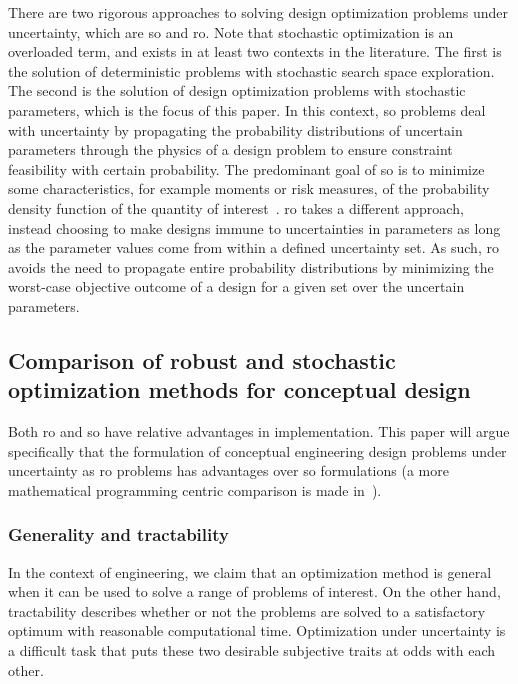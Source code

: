 There are two rigorous approaches to solving design optimization problems under uncertainty,
which are \gls{so} and \gls{ro}. Note that stochastic
optimization is an overloaded term, and exists in at least two contexts in the literature. The first is the solution
of deterministic problems with stochastic search space exploration. The second is the solution
of design optimization problems with stochastic parameters, which is the focus of this paper.
In this context, \gls{so} problems deal with uncertainty by propagating the probability distributions of
uncertain parameters through the
physics of a design problem to ensure constraint feasibility with certain probability.
The predominant goal of \gls{so} is to minimize some characteristics, for example moments or risk measures,
of the probability density function of the quantity of interest~\cite{Diwekar2008}.
\gls{ro} takes a different approach, instead choosing to make designs immune to
uncertainties in parameters as long as the parameter values come from within a defined
uncertainty set. As such, \gls{ro} avoids the need to propagate entire probability
distributions by minimizing the worst-case objective outcome of a design for a
given set over the uncertain parameters.

\subsection{Comparison of robust and stochastic optimization methods for conceptual design}
\label{sec:robustvsstochastic}

Both \gls{ro} and \gls{so} have relative advantages in implementation. This paper will
argue specifically that the formulation of conceptual engineering design problems under uncertainty as
\gls{ro} problems has advantages over \gls{so} formulations (a more
mathematical programming centric comparison is made in~\cite{Bertsimas2011}).

\subsubsection{Generality and tractability}

In the context of engineering, we claim that an optimization method is general
when it can be used to solve a range of problems of interest. On the other hand,
tractability describes whether or not the problems are solved to a satisfactory
optimum with reasonable computational time. Optimization
under uncertainty is a difficult task that puts these two desirable subjective traits
at odds with each other.

